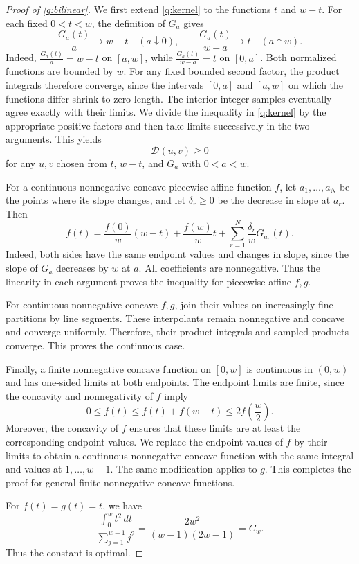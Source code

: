 \documentclass[reqno, 11pt]{article}
\numberwithin{equation}{section}
\theoremstyle{definition}
\numberwithin{equation}{section}
\begin{document}
\begin{proof}[Proof of \cref{q:bilinear}]
We first extend \cref{q:kernel} to the functions $t$ and $w-t$.
For each fixed $0<t<w$, the definition of $G_a$ gives
\[
\frac{G_a(t)}a\longrightarrow w-t
\quad(a\downarrow0),\qquad
\frac{G_a(t)}{w-a}\longrightarrow t
\quad(a\uparrow w).
\]
Indeed, $\frac{G_a(t)}{a}=w-t$ on $[a,w]$, while
$\frac{G_a(t)}{w-a}=t$ on $[0,a]$. Both normalized functions are
bounded by $w$. For any fixed bounded second factor, the product
integrals therefore converge, since the intervals $[0,a]$ and
$[a,w]$ on which the functions differ shrink to zero length.
The interior integer samples eventually agree exactly with their limits.
We divide the inequality in \cref{q:kernel} by the appropriate positive factors and then take limits successively in the two arguments. This yields
\[
\mathcal D(u,v)\ge0
\]
for any $u,v$ chosen from $t$, $w-t$, and $G_a$ with $0<a<w$.


For a continuous nonnegative concave piecewise affine
function $f$, let $a_1,\ldots,a_N$ be the points where its
slope changes, and let $\delta_r\ge0$ be the decrease
in slope at $a_r$. Then
\[
f(t)=\frac{f(0)}w(w-t)+\frac{f(w)}w t
+\sum_{r=1}^{N}\frac{\delta_r}{w}G_{a_r}(t).
\]
Indeed, both sides have the same endpoint values and
changes in slope, since the slope of $G_a$ decreases
by $w$ at $a$. All coefficients are nonnegative. Thus the linearity in each argument proves the inequality for
piecewise affine $f,g$.

For continuous nonnegative concave $f,g$, join their
values on increasingly fine partitions by line segments.
These interpolants remain nonnegative and concave and
converge uniformly. Therefore, their product integrals and sampled
products converge. This proves the continuous case.

Finally, a finite nonnegative concave function on $[0,w]$
is continuous in $(0,w)$ and has one-sided limits at both
endpoints. The endpoint limits are finite, since the concavity and nonnegativity of $f$ imply
\[
0\le f(t)\le f(t)+f(w-t)\le2f\left(\frac w2\right).
\]
Moreover, the concavity of $f$ ensures that these limits are at least the corresponding endpoint values. We replace the endpoint values of $f$ by their limits to obtain a continuous nonnegative concave function with the same integral and values at $1,\ldots,w-1$. The same modification applies to $g$. This completes the proof for general finite nonnegative concave functions.

For $f(t)=g(t)=t$, we have 
\[
\frac{\int_0^w t^2\,dt}{\sum_{j=1}^{w-1}j^2}
=\frac{2w^2}{(w-1)(2w-1)}=C_w.
\]
Thus the constant is optimal.
\end{proof}
\end{document}
